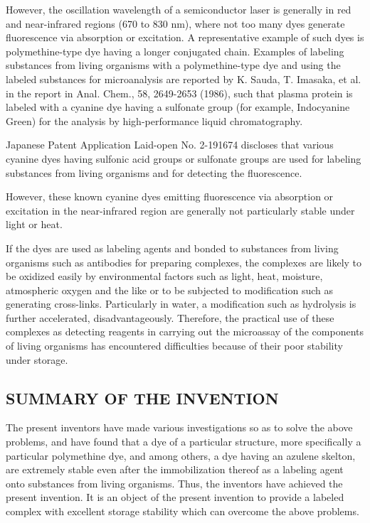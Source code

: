 \documentclass[11pt,a4paper]{article}
\begin{document}
However, the oscillation wavelength of a semiconductor laser is generally in red and near-infrared regions (670 to 830 nm), where not too many dyes generate fluorescence via absorption or excitation. A representative example of such dyes is polymethine-type dye having a longer conjugated chain. Examples of labeling substances from living organisms with a polymethine-type dye and using the labeled substances for microanalysis are reported by K. Sauda, T. Imasaka, et al. in the report in Anal. Chem., 58, 2649-2653 (1986), such that plasma protein is labeled with a cyanine dye having a sulfonate group (for example, Indocyanine Green) for the analysis by high-performance liquid chromatography.

Japanese Patent Application Laid-open No. 2-191674 discloses that various cyanine dyes having sulfonic acid groups or sulfonate groups are used for labeling substances from living organisms and for detecting the fluorescence.

However, these known cyanine dyes emitting fluorescence via absorption or excitation in the near-infrared region are generally not particularly stable under light or heat.

If the dyes are used as labeling agents and bonded to substances from living organisms such as antibodies for preparing complexes, the complexes are likely to be oxidized easily by environmental factors such as light, heat, moisture, atmospheric oxygen and the like or to be subjected to modification such as generating cross-links. Particularly in water, a modification such as hydrolysis is further accelerated, disadvantageously. Therefore, the practical use of these complexes as detecting reagents in carrying out the microassay of the components of living organisms has encountered difficulties because of their poor stability under storage.

\subsection{SUMMARY OF THE INVENTION}

The present inventors have made various investigations so as to solve the above problems, and have found that a dye of a particular structure, more specifically a particular polymethine dye, and among others, a dye having an azulene skelton, are extremely stable even after the immobilization thereof as a labeling agent onto substances from living organisms. Thus, the inventors have achieved the present invention. It is an object of the present invention to provide a labeled complex with excellent storage stability which can overcome the above problems.
\end{document}
